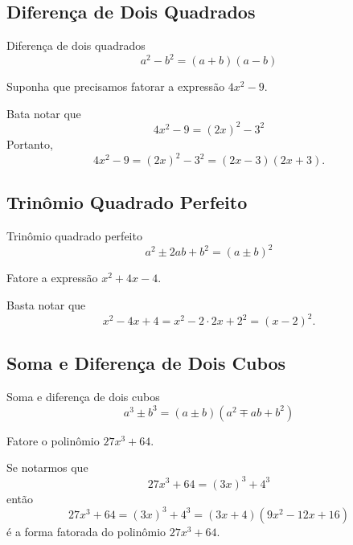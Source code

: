 \subsection{Diferença de Dois Quadrados}

Diferença de dois quadrados
\[
  a^2 - b^2 = (a+b)(a-b)
\]

\begin{example}
  Suponha que precisamos fatorar a expressão $4x^2-9$.

  \solution
  Bata notar que
  \[
    4x^2 - 9 = (2x)^2 - 3^2
  \]
  Portanto,
  \[
    4x^2 - 9
    = (2x)^2 - 3^2
    =(2x-3)(2x+3).
  \]
\end{example}

\subsection{Trinômio Quadrado Perfeito}

Trinômio quadrado perfeito
\[
  a^2 \pm 2ab + b^2
  = (a \pm b)^2
\]

\begin{example}
  Fatore a expressão $x^2+4x-4$.

  \solution
  Basta notar que
  \[
    x^2 - 4x + 4
    = x^2 - 2\cdot2x +2^2
    =(x-2)^2.
  \]
\end{example}

\subsection{Soma e Diferença de Dois Cubos}

Soma e diferença de dois cubos
\[
  a^3 \pm b^3 =
  (a \pm b)(a^2 \mp ab + b^2)
\]

\begin{example}
  Fatore o polinômio $27x^3+64$.

  \solution
  Se notarmos que
  \[
    27x^3+64 = (3x)^3+4^3
  \]
  então
  \[
    27x^3 + 64
    = (3x)^3+4^3
    = (3x+4)(9x^2-12x+16)
  \]
  é a forma fatorada do polinômio $27x^3+64$.
\end{example}

